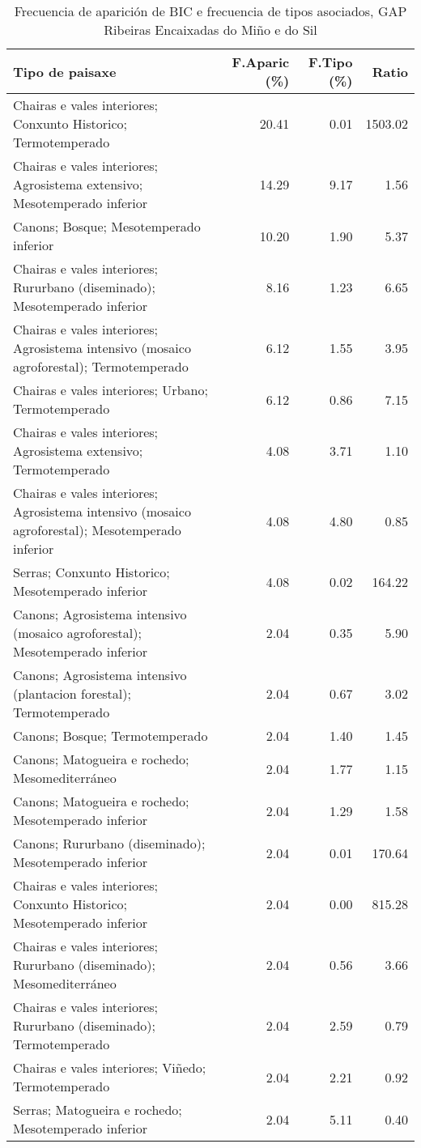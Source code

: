 \begin{table}[p]
\centering
\caption{Frecuencia de aparición de BIC e frecuencia de tipos asociados, GAP Ribeiras Encaixadas do Miño e do Sil} 
\label{vbic4}
\begin{tabular}{lrrr}
  \hline
Tipo de paisaxe & F.Aparic (\%) & F.Tipo (\%) & Ratio \\ 
  \hline
Chairas e vales interiores; Conxunto Historico; Termotemperado & 20.41 & 0.01 & 1503.02 \\ 
  Chairas e vales interiores; Agrosistema extensivo; Mesotemperado inferior & 14.29 & 9.17 & 1.56 \\ 
  Canons; Bosque; Mesotemperado inferior & 10.20 & 1.90 & 5.37 \\ 
  Chairas e vales interiores; Rururbano (diseminado); Mesotemperado inferior & 8.16 & 1.23 & 6.65 \\ 
  Chairas e vales interiores; Agrosistema intensivo (mosaico agroforestal); Termotemperado & 6.12 & 1.55 & 3.95 \\ 
  Chairas e vales interiores; Urbano; Termotemperado & 6.12 & 0.86 & 7.15 \\ 
  Chairas e vales interiores; Agrosistema extensivo; Termotemperado & 4.08 & 3.71 & 1.10 \\ 
  Chairas e vales interiores; Agrosistema intensivo (mosaico agroforestal); Mesotemperado inferior & 4.08 & 4.80 & 0.85 \\ 
  Serras; Conxunto Historico; Mesotemperado inferior & 4.08 & 0.02 & 164.22 \\ 
  Canons; Agrosistema intensivo (mosaico agroforestal); Mesotemperado inferior & 2.04 & 0.35 & 5.90 \\ 
  Canons; Agrosistema intensivo (plantacion forestal); Termotemperado & 2.04 & 0.67 & 3.02 \\ 
  Canons; Bosque; Termotemperado & 2.04 & 1.40 & 1.45 \\ 
  Canons; Matogueira e rochedo; Mesomediterráneo & 2.04 & 1.77 & 1.15 \\ 
  Canons; Matogueira e rochedo; Mesotemperado inferior & 2.04 & 1.29 & 1.58 \\ 
  Canons; Rururbano (diseminado); Mesotemperado inferior & 2.04 & 0.01 & 170.64 \\ 
  Chairas e vales interiores; Conxunto Historico; Mesotemperado inferior & 2.04 & 0.00 & 815.28 \\ 
  Chairas e vales interiores; Rururbano (diseminado); Mesomediterráneo & 2.04 & 0.56 & 3.66 \\ 
  Chairas e vales interiores; Rururbano (diseminado); Termotemperado & 2.04 & 2.59 & 0.79 \\ 
  Chairas e vales interiores; Viñedo; Termotemperado & 2.04 & 2.21 & 0.92 \\ 
  Serras; Matogueira e rochedo; Mesotemperado inferior & 2.04 & 5.11 & 0.40 \\ 
   \hline
\end{tabular}
\end{table}
